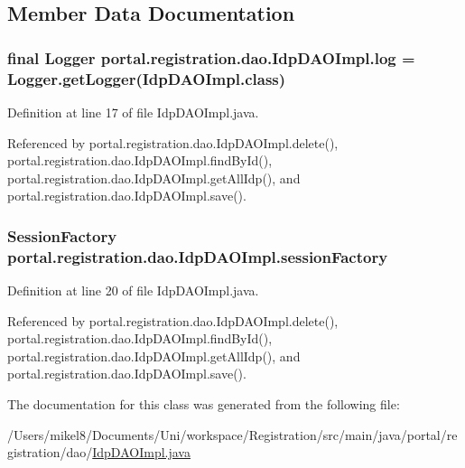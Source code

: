 \subsection{Member Data Documentation}
\hypertarget{classportal_1_1registration_1_1dao_1_1IdpDAOImpl_a7afb61fce1c69227c0233f4f9109a59e}{
\subsubsection[{log}]{\setlength{\rightskip}{0pt plus 5cm}final Logger {\bf portal.registration.dao.IdpDAOImpl.log} = Logger.getLogger(IdpDAOImpl.class)}}
\label{classportal_1_1registration_1_1dao_1_1IdpDAOImpl_a7afb61fce1c69227c0233f4f9109a59e}


Definition at line 17 of file IdpDAOImpl.java.



Referenced by portal.registration.dao.IdpDAOImpl.delete(), portal.registration.dao.IdpDAOImpl.findById(), portal.registration.dao.IdpDAOImpl.getAllIdp(), and portal.registration.dao.IdpDAOImpl.save().

\hypertarget{classportal_1_1registration_1_1dao_1_1IdpDAOImpl_a92e1382182c2bb2542cfbb22af8040dc}{
\subsubsection[{sessionFactory}]{\setlength{\rightskip}{0pt plus 5cm}SessionFactory {\bf portal.registration.dao.IdpDAOImpl.sessionFactory}}}
\label{classportal_1_1registration_1_1dao_1_1IdpDAOImpl_a92e1382182c2bb2542cfbb22af8040dc}


Definition at line 20 of file IdpDAOImpl.java.



Referenced by portal.registration.dao.IdpDAOImpl.delete(), portal.registration.dao.IdpDAOImpl.findById(), portal.registration.dao.IdpDAOImpl.getAllIdp(), and portal.registration.dao.IdpDAOImpl.save().



The documentation for this class was generated from the following file:\begin{DoxyCompactItemize}
\item 
/Users/mikel8/Documents/Uni/workspace/Registration/src/main/java/portal/registration/dao/\hyperlink{IdpDAOImpl_8java}{IdpDAOImpl.java}\end{DoxyCompactItemize}
